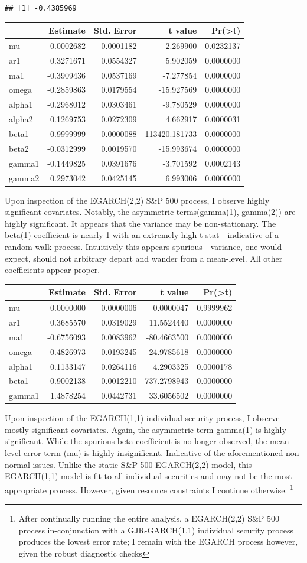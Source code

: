 \documentclass[]{elsarticle} %
\begin{document}
\begin{verbatim}
## [1] -0.4385969
\end{verbatim}

\begin{longtable}[c]{@{}lrrrr@{}}
\toprule
& Estimate & Std. Error & t value &
Pr(\textgreater{}\textbar{}t\textbar{})\tabularnewline
\midrule
\endhead
mu & 0.0002682 & 0.0001182 & 2.269900 & 0.0232137\tabularnewline
ar1 & 0.3271671 & 0.0554327 & 5.902059 & 0.0000000\tabularnewline
ma1 & -0.3909436 & 0.0537169 & -7.277854 & 0.0000000\tabularnewline
omega & -0.2859863 & 0.0179554 & -15.927569 & 0.0000000\tabularnewline
alpha1 & -0.2968012 & 0.0303461 & -9.780529 & 0.0000000\tabularnewline
alpha2 & 0.1269753 & 0.0272309 & 4.662917 & 0.0000031\tabularnewline
beta1 & 0.9999999 & 0.0000088 & 113420.181733 & 0.0000000\tabularnewline
beta2 & -0.0312999 & 0.0019570 & -15.993674 & 0.0000000\tabularnewline
gamma1 & -0.1449825 & 0.0391676 & -3.701592 & 0.0002143\tabularnewline
gamma2 & 0.2973042 & 0.0425145 & 6.993006 & 0.0000000\tabularnewline
\bottomrule
\end{longtable}

Upon inspection of the EGARCH(2,2) S\&P 500 process, I observe highly
significant covariates. Notably, the asymmetric terms(gamma(1),
gamma(2)) are highly significant. It appears that the variance may be
non-stationary. The beta(1) coefficient is nearly 1 with an extremely
high t-stat---indicative of a random walk process. Intuitively this
appears spurious---variance, one would expect, should not arbitrary
depart and wander from a mean-level. All other coefficients appear
proper.

\begin{longtable}[c]{@{}lrrrr@{}}
\toprule
& Estimate & Std. Error & t value &
Pr(\textgreater{}\textbar{}t\textbar{})\tabularnewline
\midrule
\endhead
mu & 0.0000000 & 0.0000006 & 0.0000047 & 0.9999962\tabularnewline
ar1 & 0.3685570 & 0.0319029 & 11.5524440 & 0.0000000\tabularnewline
ma1 & -0.6756093 & 0.0083962 & -80.4663500 & 0.0000000\tabularnewline
omega & -0.4826973 & 0.0193245 & -24.9785618 & 0.0000000\tabularnewline
alpha1 & 0.1133147 & 0.0264116 & 4.2903325 & 0.0000178\tabularnewline
beta1 & 0.9002138 & 0.0012210 & 737.2798943 & 0.0000000\tabularnewline
gamma1 & 1.4878254 & 0.0442731 & 33.6056502 & 0.0000000\tabularnewline
\bottomrule
\end{longtable}

Upon inspection of the EGARCH(1,1) individual security process, I
observe mostly significant covariates. Again, the asymmetric term
gamma(1) is highly significant. While the spurious beta coefficient is
no longer observed, the mean-level error term (mu) is highly
insignificant. Indicative of the aforementioned non-normal issues.
Unlike the static S\&P 500 EGARCH(2,2) model, this EGARCH(1,1) model is
fit to all individual securities and may not be the most appropriate
process. However, given resource constraints I continue otherwise.
\footnote{After continually running the entire analysis, a EGARCH(2,2)
  S\&P 500 process in-conjunction with a GJR-GARCH(1,1) individual
  security process produces the lowest error rate; I remain with the
  EGARCH process however, given the robust diagnostic checks}
\end{document}

